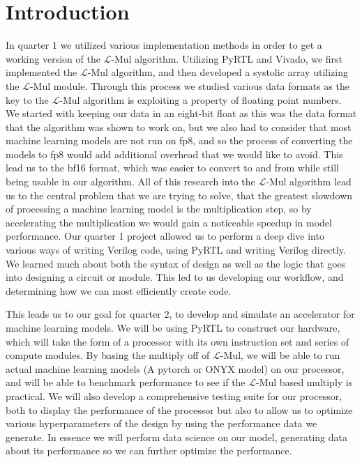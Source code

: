 \documentclass[12pt,letterpaper]{article}
\newcommand{\lmul}{$\mathcal{L}$-Mul\xspace}
\begin{document}
\section{Introduction}
In quarter 1 we utilized various implementation methods in order to get a working version of the \lmul algorithm.  Utilizing PyRTL and Vivado, we first implemented the \lmul algorithm, and then developed a systolic array utilizing the \lmul module.  Through this process we studied various data formats as the key to the \lmul algorithm is exploiting a property of floating point numbers.  We started with keeping our data in an eight-bit float as this was the data format that the algorithm was shown to work on, but we also had to consider that most machine learning models are not run on fp8, and so the process of converting the models to fp8 would add additional overhead that we would like to avoid.  This lead us to the bf16 format, which was easier to convert to and from while still being usable in our algorithm.  All of this research into the \lmul algorithm lead us to the central problem that we are trying to solve, that the greatest slowdown of processing a machine learning model is the multiplication step, so by accelerating the multiplication we would gain a noticeable speedup in model performance.  Our quarter 1 project allowed us to perform a deep dive into various ways of writing Verilog code, using PyRTL and writing Verilog directly.  We learned much about both the syntax of design as well as the logic that goes into designing a circuit or module.  This led to us developing our workflow, and determining how we can most efficiently create code.

This leads us to our goal for quarter 2, to develop and simulate an accelerator for machine learning models.  We will be using PyRTL to construct our hardware, which will take the form of a processor with its own instruction set and series of compute modules.  By basing the multiply off of \lmul, we will be able to run actual machine learning models (A pytorch or ONYX model) on our processor, and will be able to benchmark performance to see if the \lmul based multiply is practical.  We will also develop a comprehensive testing suite for our processor, both to display the performance of the processor but also to allow us to optimize various hyperparameters of the design by using the performance data we generate.  In essence we will perform data science on our model, generating data about its performance so we can further optimize the performance.  
\end{document}

